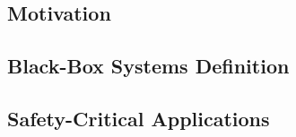 
\subsection{Motivation}

\subsection{Black-Box Systems Definition}

\subsection{Safety-Critical Applications}
